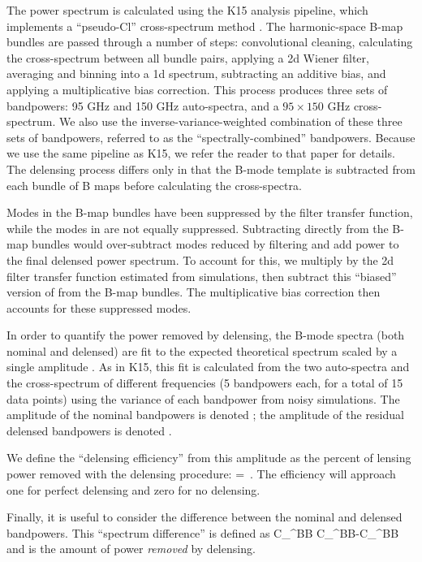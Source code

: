 The power spectrum is calculated using the K15 analysis pipeline, which implements a ``pseudo-Cl'' cross-spectrum method \citep{hivon02}.
The harmonic-space B-map bundles are passed through a number of steps: convolutional cleaning, calculating the cross-spectrum between all bundle pairs, applying a 2d Wiener filter, averaging and binning into a 1d spectrum, subtracting an additive bias, and applying a multiplicative bias correction.
This process produces three sets of bandpowers: 95 GHz and 150 GHz auto-spectra, and a $95 \times 150$ GHz cross-spectrum.
We also use the inverse-variance-weighted combination of these three sets of bandpowers, referred to as the ``spectrally-combined'' bandpowers.
Because we use the same pipeline as K15, we refer the reader to that paper for details.
The delensing process differs only in that the B-mode template \bhat{} is subtracted from each bundle of B maps before calculating the cross-spectra.

Modes in the B-map bundles have been suppressed by the filter transfer function, while the modes in \bhat{} are not equally suppressed.
Subtracting \bhat{} directly from the B-map bundles would over-subtract modes reduced by filtering and add power to the final delensed power spectrum.
To account for this, we multiply \bhat{} by the 2d filter transfer function estimated from simulations, then subtract this ``biased'' version of \bhat{} from the B-map bundles.
The multiplicative bias correction then accounts for these suppressed modes.

In order to quantify the power removed by delensing, the B-mode spectra (both nominal and delensed)  are fit to the expected  theoretical spectrum scaled by a single amplitude \Alens {}.
As in K15, this fit is calculated from the two auto-spectra and the cross-spectrum of different frequencies (5 bandpowers each, for a total of 15 data points) using the variance of each bandpower from noisy simulations.
The amplitude of the nominal bandpowers is denoted \Alens; the amplitude of the residual delensed bandpowers is denoted \Ares.

We define the ``delensing efficiency'' from this amplitude as the percent of lensing power removed with the delensing procedure:
\beq
\label{eqn:efficiency}
  \alpha = \frac{\Alens - \Ares}{\Alens} \,.
\eeq
The efficiency will approach one for perfect delensing and zero for no delensing.

Finally, it is useful to consider the difference between the nominal and delensed bandpowers.
This ``spectrum difference'' is defined as
\beq
\label{eqn:diff}
  \Delta C_{\ell}^{BB} \equiv C_{\ell}^{BB}-C_{\ell}^{BB \mathrm{,\res}}
\eeq
and is the amount of power \textit{removed} by delensing.

